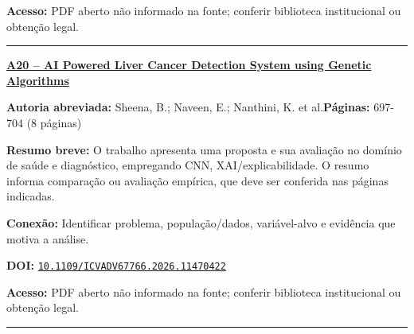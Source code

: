 \documentclass[10pt,a4paper]{article}
\begin{document}
\textbf{Acesso:} PDF aberto não informado na fonte; conferir biblioteca institucional ou obtenção legal.\par
\noindent\rule{\textwidth}{0.35pt}
\par\medskip\noindent
{\large\bfseries\href{https://doi.org/10.1109/ICVADV67766.2026.11470422}{A20 -- AI Powered Liver Cancer Detection System using Genetic Algorithms}}\par\smallskip
\textbf{Autoria abreviada:} Sheena, B.; Naveen, E.; Nanthini, K. et al.\quad \textbf{Páginas:} 697-704 (8 páginas)\par
\textbf{Resumo breve:} O trabalho apresenta uma proposta e sua avaliação no domínio de saúde e diagnóstico, empregando CNN, XAI/explicabilidade. O resumo informa comparação ou avaliação empírica, que deve ser conferida nas páginas indicadas.\par
\textbf{Conexão:} Identificar problema, população/dados, variável-alvo e evidência que motiva a análise.\par
\textbf{DOI:} \href{https://doi.org/10.1109/ICVADV67766.2026.11470422}{\nolinkurl{10.1109/ICVADV67766.2026.11470422}}\par
\textbf{Acesso:} PDF aberto não informado na fonte; conferir biblioteca institucional ou obtenção legal.\par
\noindent\rule{\textwidth}{0.35pt}
\clearpage
\end{document}
